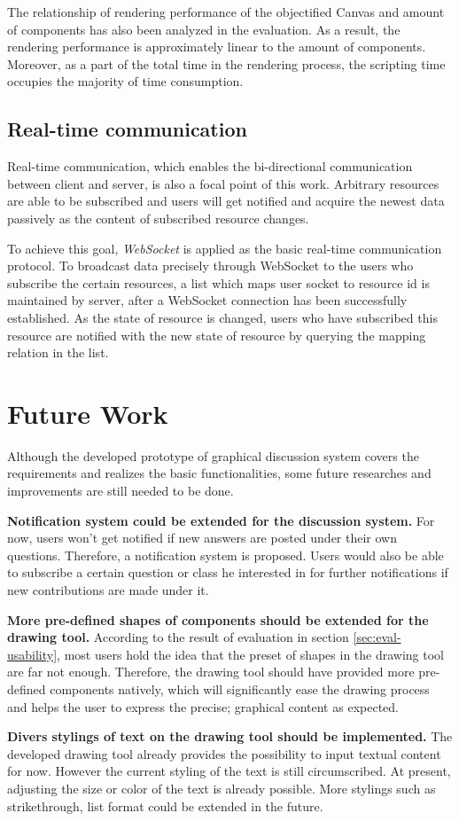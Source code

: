 The relationship of rendering performance of the objectified Canvas and amount of components has also been analyzed in the evaluation. As a result, the rendering performance is approximately linear to the amount of components. Moreover, as a part of the total time in the rendering process, the scripting time occupies the majority of time consumption. 


\subsection{Real-time communication}



Real-time communication, which enables the bi-directional communication between client and server, is also a focal point of this work. Arbitrary resources are able to be subscribed and users will get notified and acquire the newest data passively as the content of subscribed resource changes.

To achieve this goal, \textit{WebSocket} is applied as the basic real-time communication protocol. To broadcast data precisely through WebSocket to the users who subscribe the certain resources, a list which maps user socket to  resource id is maintained by server, after a WebSocket connection has been successfully established. As the state of  resource is changed, users who have subscribed this resource are notified with the new state of resource by querying the mapping relation in the list.


\section{Future Work}

Although the developed prototype of graphical discussion system covers the requirements and realizes the basic functionalities, some future researches and improvements are still needed to be done.

\textbf{Notification system could be extended for the discussion system.} For now, users won't get notified if new answers are posted under their own questions. Therefore, a notification system is proposed. Users would also be able to subscribe a certain question or class he interested in for further notifications if new contributions are made under it.

\textbf{More pre-defined shapes of components should be extended for the drawing tool.} According to the result of evaluation in section \ref{sec:eval-usability}, most users hold the idea that the preset of shapes in the drawing tool are far not enough. Therefore, the drawing tool should have provided more pre-defined components natively, which will significantly ease the drawing process and helps the user to express the precise; graphical content as expected. 

\textbf{Divers stylings of text on the drawing tool should be implemented.} The developed drawing tool already provides the possibility to input textual content for now. However the current styling of the text is still circumscribed. At present, adjusting the size or color of the text is already possible. More stylings such as strikethrough, list format could be extended in the future. 